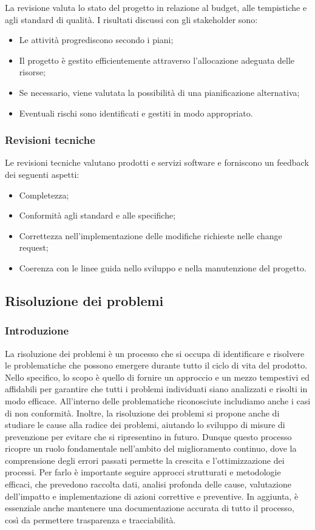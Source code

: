 La revisione valuta lo stato del progetto in relazione al budget, alle tempistiche e agli standard di qualità. I risultati discussi con gli
stakeholder sono:
\begin{itemize}
	\item Le attività progrediscono secondo i piani;
	\item Il progetto è gestito efficientemente attraverso l'allocazione adeguata delle risorse;
	\item Se necessario, viene valutata la possibilità di una pianificazione alternativa;
	\item Eventuali rischi sono identificati e gestiti in modo appropriato.
\end{itemize}

\subsubsection{Revisioni tecniche}
Le revisioni tecniche valutano prodotti e servizi software e forniscono un feedback dei seguenti aspetti:
\begin{itemize}
	\item Completezza;
	\item Conformità agli standard e alle specifiche;
	\item Correttezza nell'implementazione delle modifiche richieste nelle change request;
	\item Coerenza con le linee guida nello sviluppo e nella manutenzione del progetto.
\end{itemize}

\subsection{Risoluzione dei problemi}
\subsubsection{Introduzione}
La risoluzione dei problemi è un processo che si occupa di identificare e risolvere le problematiche che possono emergere durante tutto il ciclo
di vita del prodotto. Nello specifico, lo scopo è quello di fornire un approccio e un mezzo tempestivi ed affidabili per garantire che tutti
i problemi individuati siano analizzati e risolti in modo efficace. All'interno delle problematiche riconosciute includiamo anche i casi di non
conformità. Inoltre, la risoluzione dei problemi si propone anche di studiare le cause alla radice dei problemi, aiutando lo sviluppo di misure
di prevenzione per evitare che si ripresentino in futuro. Dunque  questo processo ricopre un ruolo fondamentale nell'ambito del miglioramento
continuo, dove la comprensione degli errori passati permette la crescita e l'ottimizzazione dei processi. Per farlo è importante seguire
approcci strutturati e metodologie efficaci, che prevedono raccolta dati, analisi profonda delle cause, valutazione dell'impatto e implementazione
di azioni correttive e preventive. In aggiunta, è essenziale anche mantenere una documentazione accurata di tutto il processo, così da
permettere trasparenza e tracciabilità.


